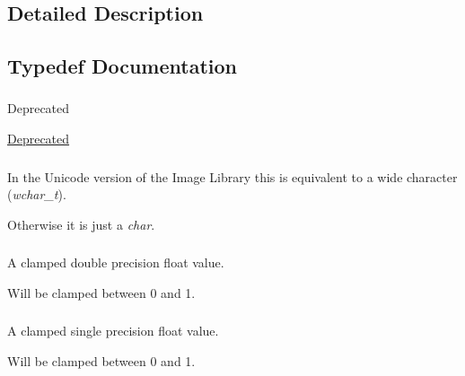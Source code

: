 \subsection{Detailed Description}


\subsection{Typedef Documentation}
\hypertarget{group__il__types_gae47e67f5430ba6989eaaf6b9a3bc8e87}{
\subsubsection[{I\+Lbitfield}]{}}\label{group__il__types_gae47e67f5430ba6989eaaf6b9a3bc8e87}
\begin{DoxyRefDesc}{Deprecated}
\item[\hyperlink{deprecated__deprecated000004}{Deprecated}]\end{DoxyRefDesc}
\hypertarget{group__il__types_gabb6e047662a2e8131c5bcd785c84ff02}{
\subsubsection[{I\+Lchar}]{}}\label{group__il__types_gabb6e047662a2e8131c5bcd785c84ff02}


In the Unicode version of the Image Library this is equivalent to a wide character ({\itshape wchar\+\_\+t}). 

Otherwise it is just a {\itshape char}. \hypertarget{group__il__types_ga2cf462921bb7bef1badc94d63f3dbd4d}{
\subsubsection[{I\+Lclampd}]{}}\label{group__il__types_ga2cf462921bb7bef1badc94d63f3dbd4d}


A clamped double precision float value. 

Will be clamped between 0 and 1. \hypertarget{group__il__types_gae90d8075bf3ef2cd89c09b26fd4dbef2}{
\subsubsection[{I\+Lclampf}]{}}\label{group__il__types_gae90d8075bf3ef2cd89c09b26fd4dbef2}


A clamped single precision float value. 

Will be clamped between 0 and 1. 